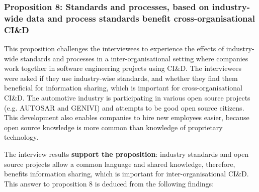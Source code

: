 
\vspace{.2cm}
\subsubsection{Proposition 8: Standards and processes, based on industry-wide data and process standards benefit cross-organisational CI\&D}

This proposition challenges the interviewees to experience the effects of industry-wide standards and processes in a inter-organisational setting where companies work together in software engineering projects using CI\&D. The interviewees were asked if they use industry-wise standards, and whether they find them beneficial for information sharing, which is important for cross-organisational CI\&D. The automotive industry is participating in various open source projects (e.g. AUTOSAR and GENIVI) and attempts to be good open source citizens. This development also enables companies to hire new employees easier, because open source knowledge is more common than knowledge of proprietary technology.

The interview results {\bf support the proposition}: industry standards and open source projects allow a common language and shared knowledge, therefore, benefits information sharing, which is important for inter-organisational CI\&D. This answer to proposition 8 is deduced from the following findings:

